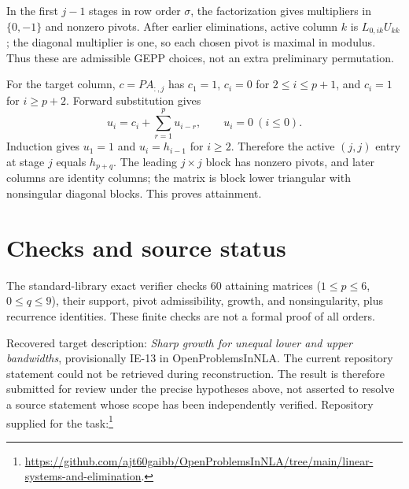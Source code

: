 \documentclass[11pt]{article}
\begin{document}
In the first $j-1$ stages in row order $\sigma$, the factorization gives multipliers in $\{0,-1\}$ and nonzero pivots. After earlier eliminations, active column $k$ is $L_{0,ik}U_{kk}$; the diagonal multiplier is one, so each chosen pivot is maximal in modulus. Thus these are admissible GEPP choices, not an extra preliminary permutation.

For the target column, $c=PA_{:,j}$ has $c_1=1$, $c_i=0$ for $2\le i\le p+1$, and $c_i=1$ for $i\ge p+2$. Forward substitution gives
\[
u_i=c_i+\sum_{r=1}^p u_{i-r},\qquad u_i=0\ (i\le0).
\]
Induction gives $u_1=1$ and $u_i=h_{i-1}$ for $i\ge2$. Therefore the active $(j,j)$ entry at stage $j$ equals $h_{p+q}$. The leading $j\times j$ block has nonzero pivots, and later columns are identity columns; the matrix is block lower triangular with nonsingular diagonal blocks. This proves attainment.
\section{Checks and source status}
The standard-library exact verifier checks 60 attaining matrices ($1\le p\le6$, $0\le q\le9$), their support, pivot admissibility, growth, and nonsingularity, plus recurrence identities. These finite checks are not a formal proof of all orders.

Recovered target description: \emph{Sharp growth for unequal lower and upper bandwidths}, provisionally IE-13 in OpenProblemsInNLA. The current repository statement could not be retrieved during reconstruction. The result is therefore submitted for review under the precise hypotheses above, not asserted to resolve a source statement whose scope has been independently verified. Repository supplied for the task:\footnote{\url{https://github.com/ajt60gaibb/OpenProblemsInNLA/tree/main/linear-systems-and-elimination}.}
\end{document}
